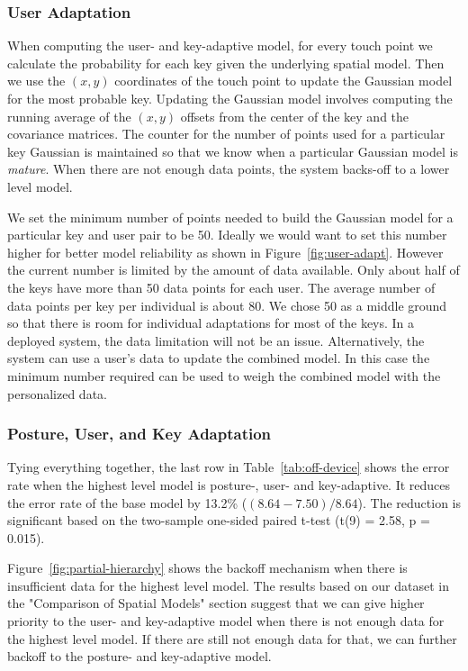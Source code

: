 \documentclass{sigchi}
\begin{document}
\subsubsection{User Adaptation}
When computing the user- and key-adaptive model, for every touch point
we calculate the probability for each key given the underlying spatial model.
Then we use the $(x, y)$ coordinates of the touch point to update the Gaussian model for the most probable key. Updating the Gaussian model involves computing the running average of the $(x, y)$ offsets from the center of the key and the covariance matrices. The counter for the number of points used for a particular key Gaussian is maintained so that we
know when a particular Gaussian model is \textit{mature}. When there are not enough data points, the system backs-off to a lower level model.

We set the minimum number of points needed to build the
Gaussian model for a particular key and user pair to be 50.
Ideally we would want to set this number higher for better model reliability as
shown in Figure~\ref{fig:user-adapt}. However the current number is limited by
the amount of data available.  Only about half of the keys
have more than 50 data points for each user. The average number of data
points per key per individual is about 80. We chose 50 as a middle ground so
that there is room for individual adaptations for most of the keys. In a deployed system,
the data limitation will not be an issue. Alternatively, the system can use a user's data to
update the combined model. In this case the minimum
number required can be used to weigh the combined model with the personalized data.

\subsubsection{Posture, User, and Key Adaptation}
Tying everything together, the last row in Table~\ref{tab:off-device} shows the
error rate when the highest level model is posture-, user- and key-adaptive.
It reduces the error rate of the base model by 13.2\% ($(8.64 - 7.50) / 8.64$). The reduction is significant based on
the two-sample one-sided paired t-test (t(9) = 2.58, p = 0.015).

Figure~\ref{fig:partial-hierarchy} shows the backoff mechanism when there is insufficient data for the highest level model. The results based on our dataset in the "Comparison of Spatial Models" section suggest that we
can give higher priority to the user- and key-adaptive model when there is not enough data for
the highest level model. If there are still not enough data for that, we
can further backoff to the posture- and key-adaptive model.
\end{document}
